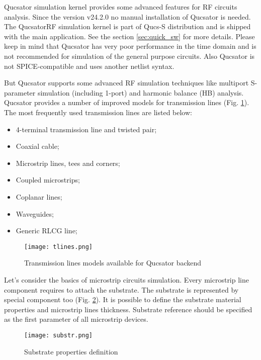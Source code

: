 Qucsator simulation kernel provides some advanced features for RF circuits analysis. Since the version v24.2.0 no manual installation of Qucsator is needed. The QucsatorRF simulation kernel is part of Qucs-S distribution and is shipped with the main application. See the section \ref{sec:quick_sw} for more details. Please keep in mind that Qucsator has very poor performance in the time domain and is not recommended for simulation of the general purpose circuits. Also Qucsator is not SPICE-compatible and uses another netlist syntax.

But Qucsator supports some advanced RF simulation techniques like multiport S-parameter simulation (including 1-port) and harmonic balance (HB) analysis. Qucsator provides a number of improved models for transmission lines (Fig. \ref{fig:tlines}). The most frequently used transmission lines are listed below:

\begin{itemize}
 \item 4-terminal transmission line and twisted pair;
 \item Coaxial cable;
 \item Microstrip lines, tees and corners;
 \item Coupled microstrips;
 \item Coplanar lines;
 \item Waveguides;
 \item Generic RLCG line;
\end{itemize}

    \begin{figure}[!ht]
    \begin{center}
        \texttt{[image: tlines.png]}
    \end{center}
    \caption{Transmission lines models available for Qucsator backend} \label{fig:tlines}
    \end{figure}

Let's consider the basics of microstrip circuits simulation. Every microstrip line component requires to attach the substrate. The substrate is represented by special component too (Fig. \ref{fig:subst}). It is possible to define the substrate material properties and microstrip lines thickness. Substrate reference should be specified as the first parameter of all microstrip devices.

    \begin{figure}[!ht]
    \begin{center}
        \texttt{[image: substr.png]}
    \end{center}
    \caption{Substrate properties definition} \label{fig:subst}
    \end{figure}

